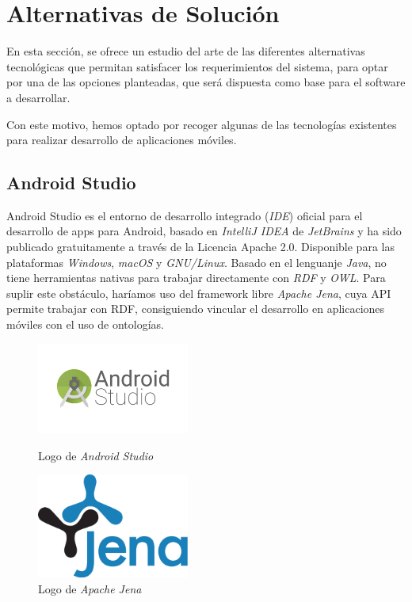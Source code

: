 

\section{Alternativas de Solución}
En esta sección, se ofrece un estudio del arte de las diferentes alternativas tecnológicas que permitan satisfacer 
los requerimientos del sistema, para optar por una de las opciones planteadas, que será dispuesta como base 
para el software a desarrollar.\medskip

Con este motivo, hemos optado por recoger algunas de las tecnologías existentes para realizar desarrollo de aplicaciones 
móviles.

\subsection{Android Studio}
Android Studio es el entorno de desarrollo integrado (\textit{IDE}) oficial para el desarrollo de apps para Android, 
basado en \textit{IntelliJ IDEA} de \textit{JetBrains} y ha sido publicado gratuitamente a través de la Licencia Apache 2.0.
Disponible para las plataformas \textit{Windows}, \textit{macOS} y \textit{GNU/Linux}. Basado en el lenguanje \textit{Java},
no tiene herramientas nativas para trabajar directamente con \textit{RDF} y \textit{OWL}. Para suplir este obstáculo, 
haríamos uso del framework libre \textit{Apache Jena}, cuya API permite trabajar con RDF, consiguiendo vincular 
el desarrollo en aplicaciones móviles con el uso de ontologías.

\begin{figure}[H]
    \centering
    \begin{minipage}{5cm}
        \centering
        \includegraphics[width=5cm]{Images/Logo_Android_Studio.png}
        \caption{Logo de \textit{Android Studio}}  
    \end{minipage}
    \hfill
    \begin{minipage}{5cm}
        \centering
        \includegraphics[width=5cm]{Images/Logo_Jena.png}
        \caption{Logo de \textit{Apache Jena}}  
    \end{minipage}
\end{figure}

